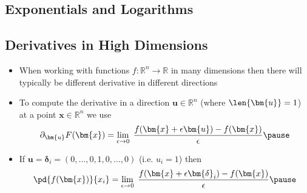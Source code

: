 
\begin{slide}
\section[-2]{Exponentials and Logarithms}

\pb
\pause{} 
\begin{center}
\pause  
\end{center}

\end{slide}


\Outline %

\begin{slide}
\section{Derivatives in High Dimensions}

\begin{PauseHighLight}
  \begin{itemize}
  \item When working with functions $f:\mathbb{R}^n \rightarrow
    \mathbb{R}$ in many dimensions then there will typically be
    different derivative in different directions\pause
  \item To compute the derivative in a direction
    $\bm{u} \in \mathbb{R}^n$ (where $\len{\bm{u}}=1$) at a point
    $\bm{x} \in \mathbb{R}^n$ we use
    \begin{align*}
      \partial_{\bm{u}} F(\bm{x}) = \lim_{\epsilon\rightarrow0}\;
      \frac{f(\bm{x}+ \epsilon \bm{u}) - f(\bm{x})}{\epsilon}\pause
    \end{align*}
  \item If $\bm{u} = \bm{\delta}_i = (0,\ldots,0,1,0,\ldots,0)$
    (i.e. $u_i = 1$) then
    \begin{align*}
      \pd{f(\bm{x})}{x_i} = \lim_{\epsilon\rightarrow0}\;
      \frac{f(\bm{x}+ \epsilon \bm{\delta}_i) - f(\bm{x})}{\epsilon}\pause
    \end{align*}
  \end{itemize}
\end{PauseHighLight}

\end{slide}


